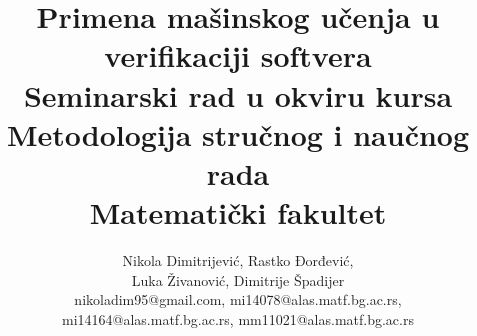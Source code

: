 \documentclass[a4paper]{article}
\theoremstyle{definition}
\begin{document}

\title{Primena mašinskog učenja u verifikaciji softvera\\ \small{Seminarski rad u okviru kursa\\Metodologija stručnog i naučnog rada\\ Matematički fakultet}}

\author{Nikola Dimitrijević, Rastko Đorđević,\\
 Luka Živanović, Dimitrije Špadijer\\
 nikoladim95@gmail.com, mi14078@alas.matf.bg.ac.rs,\\
  mi14164@alas.matf.bg.ac.rs, mm11021@alas.matf.bg.ac.rs}
\vspace*{-3cm}
    {\let\newpage\relax\maketitle}
\end{document}
